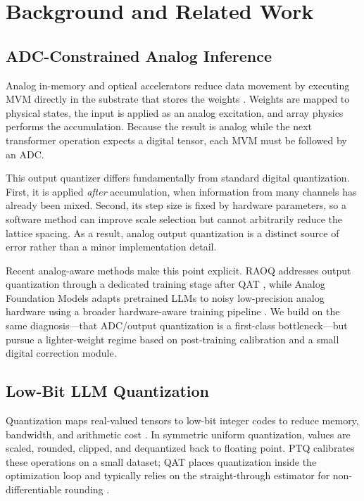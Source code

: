 \documentclass[letterpaper]{article} %
\theoremstyle{plain}
\begin{document}
    \section{Background and Related Work}
    
    \subsection{ADC-Constrained Analog Inference}
    
    Analog in-memory and optical accelerators reduce data movement by executing MVM directly in the substrate that stores the weights \cite{xiao2021accuracy,spall2022hybrid,legallo2023mixed}. Weights are mapped to physical states, the input is applied as an analog excitation, and array physics performs the accumulation. Because the result is analog while the next transformer operation expects a digital tensor, each MVM must be followed by an ADC.
    
    This output quantizer differs fundamentally from standard digital quantization. First, it is applied \emph{after} accumulation, when information from many channels has already been mixed. Second, its step size is fixed by hardware parameters, so a software method can improve scale selection but cannot arbitrarily reduce the lattice spacing. As a result, analog output quantization is a distinct source of error rather than a minor implementation detail.
    
    Recent analog-aware methods make this point explicit. RAOQ addresses output quantization through a dedicated training stage after QAT \cite{tang2024raoq}, while Analog Foundation Models adapts pretrained LLMs to noisy low-precision analog hardware using a broader hardware-aware training pipeline \cite{buchel2025analog}. We build on the same diagnosis---that ADC/output quantization is a first-class bottleneck---but pursue a lighter-weight regime based on post-training calibration and a small digital correction module.
    
    \subsection{Low-Bit LLM Quantization}
    
    Quantization maps real-valued tensors to low-bit integer codes to reduce memory, bandwidth, and arithmetic cost \cite{gholami2021survey,jacob2018quantization}. In symmetric uniform quantization, values are scaled, rounded, clipped, and dequantized back to floating point. PTQ calibrates these operations on a small dataset; QAT places quantization inside the optimization loop and typically relies on the straight-through estimator for non-differentiable rounding \cite{esser2019learned}.
    
\end{document}
